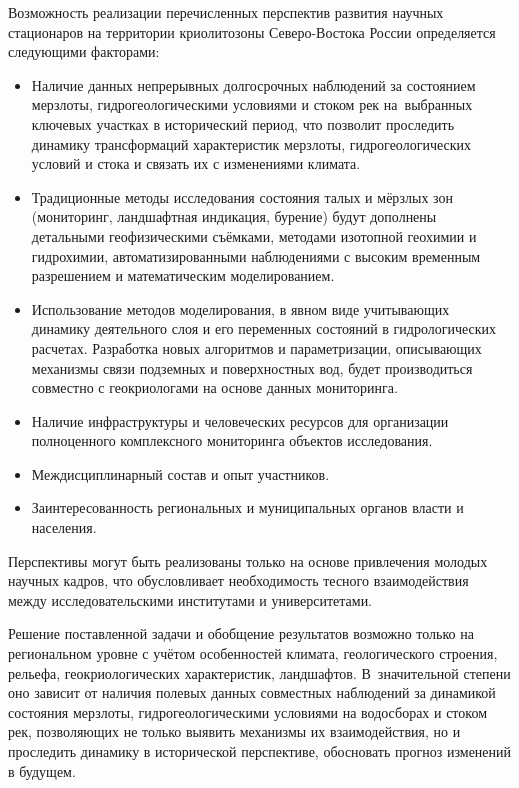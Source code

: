 Возможность реализации перечисленных перспектив развития научных стационаров на территории криолитозоны Северо-Востока России определяется следующими факторами:
\begin{itemize}[noitemsep]\vspace{-8pt}
\item Наличие данных непрерывных долгосрочных наблюдений за состоянием мерзлоты, гидрогеологическими условиями и стоком рек на~выбранных ключевых участках в исторический период, что позволит проследить динамику трансформаций характеристик мерзлоты, гидрогеологических условий и стока и связать их с изменениями климата.
\item Традиционные методы исследования состояния талых и мёрзлых зон (мониторинг, ландшафтная индикация, бурение) будут дополнены детальными геофизическими съёмками, методами изотопной геохимии и гидрохимии, автоматизированными наблюдениями с высоким временным разрешением и математическим моделированием.
\item Использование методов моделирования, в явном виде учитывающих динамику деятельного слоя и его переменных состояний в гидрологических расчетах. Разработка новых алгоритмов и параметризации, описывающих механизмы связи подземных и поверхностных вод, будет производиться совместно с геокриологами на основе данных мониторинга.
\item Наличие инфраструктуры и человеческих ресурсов для организации полноценного комплексного мониторинга объектов исследования.
\item Междисциплинарный состав и опыт участников.
\item Заинтересованность региональных и муниципальных органов власти и населения.
\end{itemize}
 \vspace{-8pt}

Перспективы могут быть реализованы только на основе привлечения молодых научных кадров, что обусловливает необходимость тесного взаимодействия между исследовательскими институтами и университетами.

Решение поставленной задачи и обобщение результатов возможно только на региональном уровне с учётом особенностей климата, геологического строения, рельефа, геокриологических характеристик, ландшафтов. В~значительной степени оно зависит от наличия полевых данных совместных наблюдений за динамикой состояния мерзлоты, гидрогеологическими условиями на водосборах и стоком рек, позволяющих не только выявить механизмы их взаимодействия, но и проследить динамику в исторической перспективе, обосновать прогноз изменений в будущем.

